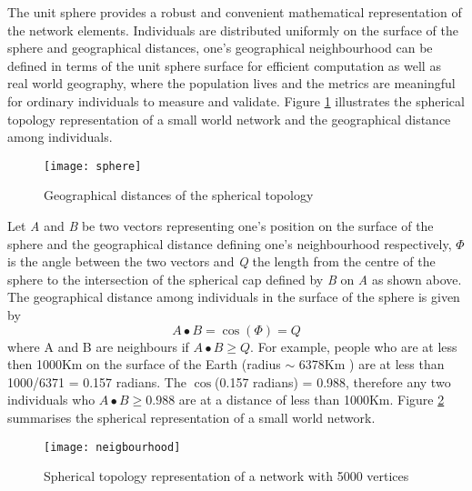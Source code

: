 The unit sphere provides a robust and convenient mathematical representation of the
network elements. Individuals are distributed uniformly on the surface of the sphere and
geographical distances, one's geographical neighbourhood can be defined in terms of the
unit sphere surface for efficient computation as well as real world geography, where the
population lives and the metrics are meaningful for ordinary individuals to measure and
validate. Figure \ref{figsphere} illustrates the spherical topology representation of a
small world network and the geographical distance among individuals.

\begin{figure}[ht]
\begin{center}
\texttt{[image: sphere]}
\caption{Geographical distances of the spherical topology} \label{figsphere}
\end{center}
\end{figure}

Let \emph{A} and \emph{B} be two vectors representing one's position on the surface of
the sphere and the geographical distance defining one's neighbourhood respectively,
$\Phi$ is the angle between the two vectors and \emph{Q} the length from the centre of
the sphere to the intersection of the spherical cap defined by \emph{B} on \emph{A} as
shown above. The geographical distance among individuals in the surface of the sphere is
given by
\begin{equation}\label{spheredist}
    A \bullet B = \cos(\Phi) = Q
\end{equation}
where A and B are neighbours if $A \bullet B \geq Q$. For example, people who are at less
then 1000Km on the surface of the Earth (radius $\sim$ 6378Km
\cite{Moritz1980,Groten2004}) are at less than 1000/6371 = 0.157 radians. The
$\cos$(0.157 radians) = 0.988, therefore any two individuals who $A \bullet B \geq 0.988$
are at a distance of less than 1000Km. Figure \ref{neigbourhood} summarises the spherical
representation of a small world network.

\begin{figure}[h]
\begin{center}
\texttt{[image: neigbourhood]}
\caption{Spherical topology representation of a network with 5000 vertices}
\label{neigbourhood}
\end{center}
\end{figure}

